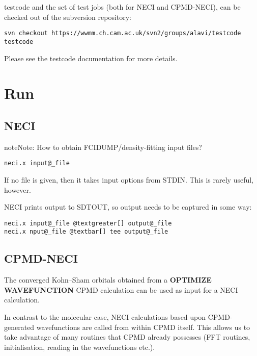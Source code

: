 \documentclass[openany,a4paper,10pt,english]{manual}
\begin{document}
testcode and the set of test jobs (both for NECI and CPMD-NECI), can be
checked out of the subversion repository:

\begin{Verbatim}[commandchars=@\[\]]
svn checkout https://wwmm.ch.cam.ac.uk/svn2/groups/alavi/testcode testcode
\end{Verbatim}

Please see the testcode documentation for more details.

\resetcurrentobjects
\hypertarget{--doc-run}{}

\hypertarget{run}{}\chapter{Run}


\section{NECI}

\begin{notice}{note}{Note:}
How to obtain FCIDUMP/density-fitting input files?
\end{notice}

\begin{Verbatim}[commandchars=@\[\]]
neci.x input@_file
\end{Verbatim}

If no file is given, then it takes input options from STDIN.  This is rarely useful, however.

NECI prints output to SDTOUT, so output needs to be captured in some way:

\begin{Verbatim}[commandchars=@\[\]]
neci.x input@_file @textgreater[] output@_file
neci.x nput@_file @textbar[] tee output@_file
\end{Verbatim}


\section{CPMD-NECI}

The converged Kohn--Sham orbitals obtained from a \textbf{OPTIMIZE
WAVEFUNCTION} CPMD calculation can be used as input for a NECI
calculation.

In contrast to the molecular case, NECI calculations based upon
CPMD-generated wavefunctions are called from within CPMD itself.
This allows us to take advantage of many routines that CPMD already
possesses (FFT routines, initialisation, reading in the wavefunctions
etc.).
\end{document}
